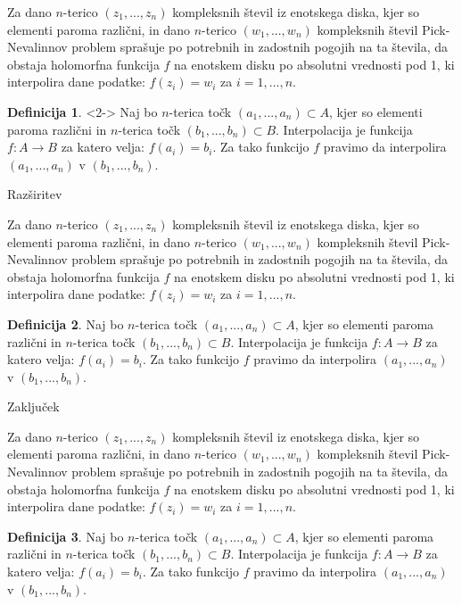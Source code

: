 \documentclass{beamer}
\theoremstyle{definition} %
\newtheorem{definicija}{Definicija}[section]
\theoremstyle{plain} %
\begin{document}
	\begin{frame}{\lae}
	
		Za dano $n$-terico $(z_1,...,z_n)$ kompleksnih števil iz enotskega diska, kjer so elementi paroma različni, in dano $n$-terico $(w_1,...,w_n)$ kompleksnih števil Pick-Nevalinnov problem sprašuje po potrebnih in zadostnih pogojih na ta števila, da obstaja holomorfna funkcija $f$ na enotskem disku po absolutni vrednosti pod 1, ki interpolira dane podatke: $f(z_i) = w_i$ za $i = 1,...,n$. 

		\begin{definicija}<2->
			Naj bo $n$-terica točk $(a_1,...,a_n) \subset A$, kjer so elementi paroma različni in $n$-terica točk $(b_1,...,b_n) \subset B$. Interpolacija je funkcija $f:A \rightarrow B$ za katero velja: $f(a_i) = b_i$. Za tako funkcijo  $f$ pravimo da interpolira $(a_1,...,a_n)$ v  $(b_1,...,b_n)$.
		\end{definicija}
	
	\end{frame}



	\begin{frame}{Razširitev}
		
		Za dano $n$-terico $(z_1,...,z_n)$ kompleksnih števil iz enotskega diska, kjer so elementi paroma različni, in dano $n$-terico $(w_1,...,w_n)$ kompleksnih števil Pick-Nevalinnov problem sprašuje po potrebnih in zadostnih pogojih na ta števila, da obstaja holomorfna funkcija $f$ na enotskem disku po absolutni vrednosti pod 1, ki interpolira dane podatke: $f(z_i) = w_i$ za $i = 1,...,n$. 

		\begin{definicija}
			Naj bo $n$-terica točk $(a_1,...,a_n) \subset A$, kjer so elementi paroma različni in $n$-terica točk $(b_1,...,b_n) \subset B$. Interpolacija je funkcija $f:A \rightarrow B$ za katero velja: $f(a_i) = b_i$. Za tako funkcijo  $f$ pravimo da interpolira $(a_1,...,a_n)$ v  $(b_1,...,b_n)$.
		\end{definicija}
		
	\end{frame}



	\begin{frame}{Zaključek}
		
		Za dano $n$-terico $(z_1,...,z_n)$ kompleksnih števil iz enotskega diska, kjer so elementi paroma različni, in dano $n$-terico $(w_1,...,w_n)$ kompleksnih števil Pick-Nevalinnov problem sprašuje po potrebnih in zadostnih pogojih na ta števila, da obstaja holomorfna funkcija $f$ na enotskem disku po absolutni vrednosti pod 1, ki interpolira dane podatke: $f(z_i) = w_i$ za $i = 1,...,n$. 

		\begin{definicija}
			Naj bo $n$-terica točk $(a_1,...,a_n) \subset A$, kjer so elementi paroma različni in $n$-terica točk $(b_1,...,b_n) \subset B$. Interpolacija je funkcija $f:A \rightarrow B$ za katero velja: $f(a_i) = b_i$. Za tako funkcijo  $f$ pravimo da interpolira $(a_1,...,a_n)$ v  $(b_1,...,b_n)$.
		\end{definicija}
		
	\end{frame}
	
\end{document}
